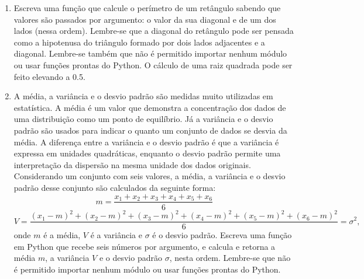 \begin{enumerate}[label=\textbf{Q\arabic*.}]
    


    \item Escreva uma função que calcule o perímetro de um retângulo sabendo que valores são passados por argumento: o valor da sua diagonal e de um dos lados (nessa ordem). Lembre-se que a diagonal do retângulo pode ser pensada como a hipotenusa do triângulo formado por dois lados adjacentes e a diagonal. Lembre-se também que não é permitido importar nenhum módulo ou usar funções prontas do Python. O cálculo de uma raiz quadrada pode ser feito elevando a 0.5.

    


    \item A média, a variância e o desvio padrão são medidas muito utilizadas em estatística. A média é um valor que demonstra a concentração dos dados de uma distribuição como um ponto de equilíbrio. Já a variância e o desvio padrão são usados para indicar o quanto um conjunto de dados se desvia da média. A diferença entre a variância e o desvio padrão é que a variância é expressa em unidades quadráticas, enquanto o desvio padrão permite uma interpretação da dispersão na mesma unidade dos dados originais. Considerando um conjunto com seis valores, a média, a variância e o desvio padrão desse conjunto são calculados da seguinte forma:
    \[
    m = \frac{x_1 + x_2 + x_3 + x_4 + x_5 + x_6}{6}
    \]
    \[
    V = \frac{(x_1 - m)^2 + (x_2 - m)^2 + (x_3 - m)^2 + (x_4 - m)^2 + (x_5 - m)^2 + (x_6 - m)^2}{6} = \sigma^2,
    \]
    onde $m$ é a média, $V$ é a variância e $\sigma$ é o desvio padrão. Escreva uma função em Python que recebe seis números por argumento, e calcula e retorna a média $m$, a variância $V$ e o desvio padrão $\sigma$, nesta ordem. Lembre-se que não é permitido importar nenhum módulo ou usar funções prontas do Python.

    

    
\end{enumerate}
